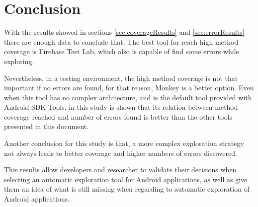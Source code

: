 
\chapter{Conclusion} %
\label{Chapter5}

With the results showed in sections \ref{sec:coverageResults} and \ref{sec:errorResults} there are enough data to conclude that: The best tool for reach high method coverage is Firebase Test Lab, which also is capable of find some errors while exploring.

Nevertheless, in a testing environment, the high method coverage is not that important if no errors are found, for that reason, Monkey is a better option. Even when this tool has no complex architecture, and is the default tool provided with Android SDK Tools, in this study is shown that its relation between method coverage reached and number of errors found is better than the other tools presented in this document. 

Another conclusion for this study is that, a more complex exploration strategy not always leads to better coverage and higher numbers of errors discovered.

This results allow developers and researcher to validate their decisions when selecting an automatic exploration tool for Android applications, as well as give them an idea of what is still missing when regarding to automatic exploration of Android applications.